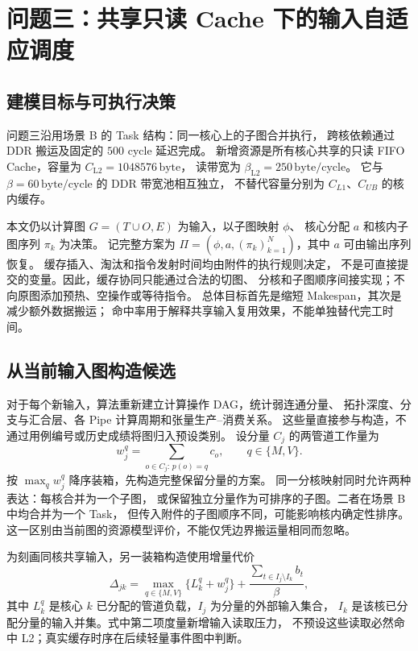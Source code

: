 \section{问题三：共享只读 Cache 下的输入自适应调度}

\subsection{建模目标与可执行决策}
问题三沿用场景 B 的 Task 结构：同一核心上的子图合并执行，
跨核依赖通过 DDR 搬运及固定的 $500$ cycle 延迟完成。
新增资源是所有核心共享的只读 FIFO Cache，容量为
$C_{\mathrm{L2}}=1048576\,\mathrm{byte}$，
读带宽为 $\beta_{\mathrm{L2}}=250\,\mathrm{byte/cycle}$。
它与 $\beta=60\,\mathrm{byte/cycle}$ 的 DDR 带宽池相互独立，
不替代容量分别为 $C_{L1}$、$C_{UB}$ 的核内缓存。

本文仍以计算图 $G=(T\cup O,E)$ 为输入，以子图映射 $\phi$、
核心分配 $a$ 和核内子图序列 $\pi_k$ 为决策。
记完整方案为 $\Pi=(\phi,a,(\pi_k)_{k=1}^N)$，其中 $a$ 可由输出序列恢复。
缓存插入、淘汰和指令发射时间均由附件的执行规则决定，
不是可直接提交的变量。因此，缓存协同只能通过合法的切图、
分核和子图顺序间接实现；不向原图添加预热、空操作或等待指令。
总体目标首先是缩短 Makespan，其次是减少额外数据搬运；
命中率用于解释共享输入复用效果，不能单独替代完工时间。

\subsection{从当前输入图构造候选}
对于每个新输入，算法重新建立计算操作 DAG，统计弱连通分量、
拓扑深度、分支与汇合层、各 Pipe 计算周期和张量生产--消费关系。
这些量直接参与构造，不通过用例编号或历史成绩将图归入预设类别。
设分量 $C_j$ 的两管道工作量为
\[
w_j^q=\sum_{o\in C_j:\,p(o)=q}c_o,\qquad q\in\{M,V\}.
\]
按 $\max_q w_j^q$ 降序装箱，先构造完整保留分量的方案。
同一分核映射同时允许两种表达：每核合并为一个子图，
或保留独立分量作为可排序的子图。二者在场景 B 中均合并为一个 Task，
但传入附件的子图顺序不同，可能影响核内确定性排序。
这一区别由当前图的资源模型评价，不能仅凭边界搬运量相同而忽略。

为刻画同核共享输入，另一装箱构造使用增量代价
\begin{equation}
\Delta_{jk}=
\max_{q\in\{M,V\}}\{L_k^q+w_j^q\}
+\frac{\displaystyle\sum_{t\in I_j\setminus I_k}b_t}{\beta},
\label{eq:q3-affinity}
\end{equation}
其中 $L_k^q$ 是核心 $k$ 已分配的管道负载，$I_j$ 为分量的外部输入集合，
$I_k$ 是该核已分配分量的输入并集。式中第二项度量新增输入读取压力，
不预设这些读取必然命中 L2；真实缓存时序在后续轻量事件图中判断。

